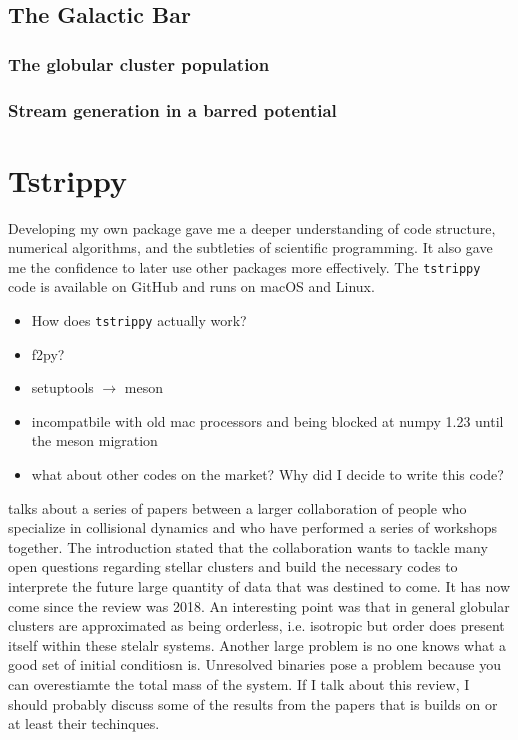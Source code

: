     \subsection{The Galactic Bar}

        \subsubsection{The globular cluster population}


        \subsubsection{Stream generation in a barred potential}


\section{Tstrippy}

    Developing my own package gave me a deeper understanding of code structure, numerical algorithms, and the subtleties of scientific programming. It also gave me the confidence to later use other packages more effectively. The \texttt{tstrippy} code is available on GitHub and runs on macOS and Linux.

    \begin{itemize}
        \item How does \texttt{tstrippy} actually work?
        \item f2py? 
        \item setuptools $\rightarrow$ meson 
        \item incompatbile with old mac processors and being blocked at numpy 1.23 until the meson migration 
        \item what about other codes on the market? Why did I decide to write this code? 
    \end{itemize}

    \citet{2018ComAC...5....2V} talks about a series of papers between a larger collaboration of people who specialize in collisional dynamics and who have performed a series of workshops together. The introduction stated that the collaboration wants to tackle many open questions regarding stellar clusters and build the necessary codes to interprete the future large quantity of data that was destined to come. It has now come since the review was 2018. An interesting point was that in general globular clusters are approximated as being orderless, i.e. isotropic but order does present itself within these stelalr systems. Another large problem is no one knows what a good set of initial conditiosn is. Unresolved binaries pose a problem because you can overestiamte the total mass of the system. If I talk about this review, I should probably discuss some of the results from the papers that is builds on or at least their techinques.

